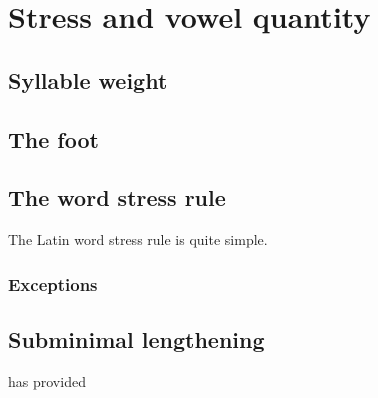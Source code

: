 \chapter{Stress and vowel quantity}

\section{Syllable weight}

\citet{Ryan2011}

\section{The foot}

\section{The word stress rule}

The Latin word stress rule is quite simple.

\subsection{Exceptions}

\section{Subminimal lengthening}

\citet{Mester1994} has provided
